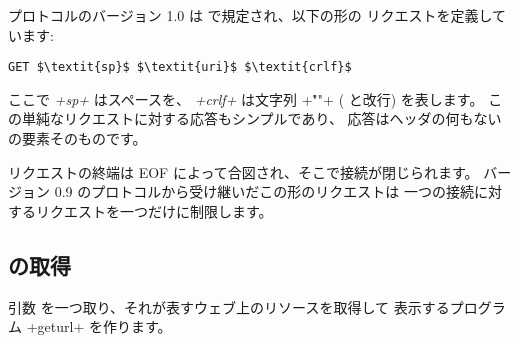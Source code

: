 \http プロトコルのバージョン 1.0 は  で規定され、以下の形の
リクエストを定義しています:
\begin{lstlisting}
GET $\textit{sp}$ $\textit{uri}$ $\textit{crlf}$
\end{lstlisting}
ここで \textit{\ml+sp+} はスペースを、 \textit{\ml+crlf+} は文字列
\ml+"\r\n"+ ( と改行) を表します。
この単純なリクエストに対する応答もシンプルであり、
応答はヘッダの何もない \URL の要素そのものです。

リクエストの終端は EOF によって合図され、そこで接続が閉じられます。
バージョン 0.9 のプロトコルから受け継いだこの形のリクエストは
一つの接続に対するリクエストを一つだけに制限します。

\subsection*{{\normalfont\URL} の取得}

引数 \URL を一つ取り、それが表すウェブ上のリソースを取得して
表示するプログラム \ml+geturl+ を作ります。


